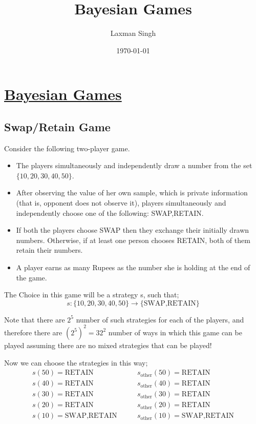\documentclass[12pt,a4paper,fleqn]{article}
\author{Laxman Singh}
\date{\today}
\title{Bayesian Games}
\begin{document}
\section{\underline{Bayesian Games}}
\subsection{Swap/Retain Game}

Consider the following two-player game.
\begin{itemize}
\item The players simultaneously and independently draw a number from the set \(\{10,20,30,40,50\}\).

\item After observing the value of her own sample, which is private information (that is, opponent does not observe it), players simultaneously and independently choose one of the following: 
SWAP,RETAIN.

\item If both the players choose SWAP then they exchange their initially drawn numbers. Otherwise, if at least one person chooses RETAIN, both of them retain their numbers.

\item A player earns as many Rupees as the number she is holding at the end of the game.
\end{itemize}
 
The Choice in this game will be a strategy s, such that;
\begin{equation*}
    s:\{10,20,30,40,50\} \rightarrow \{\text{SWAP,RETAIN}\}
\end{equation*}    

Note that there are \(2^5\) number of such strategies for each of the players, and therefore there are \((2^5)^2=32^2\) number of ways in which this game can be played assuming there are no mixed strategies that can be played!

Now we can choose the strategies in this way;
 \begin{align*}
    s(50)= \text{RETAIN} & \qquad s_{\text{other}}(50)=\text{RETAIN}\\
    s(40)= \text{RETAIN} & \qquad s_{\text{other}}(40)=\text{RETAIN}\\
    s(30)= \text{RETAIN} & \qquad s_{\text{other}}(30)=\text{RETAIN}\\
    s(20)= \text{RETAIN} & \qquad s_{\text{other}}(20)=\text{RETAIN}\\
    s(10)= \text{SWAP,RETAIN} & \qquad s_{\text{other}}(10)=\text{SWAP,RETAIN}\\
\end{align*}
\end{document}
